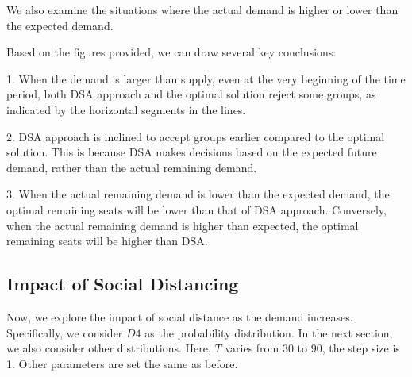 We also examine the situations where the actual demand is higher or lower than the expected demand.


Based on the figures provided, we can draw several key conclusions:

1. When the demand is larger than supply, even at the very beginning of the time period, both DSA approach and the optimal solution reject some groups, as indicated by the horizontal segments in the lines.

2. DSA approach is inclined to accept groups earlier compared to the optimal solution. This is because DSA makes decisions based on the expected future demand, rather than the actual remaining demand.

3. When the actual remaining demand is lower than the expected demand, the optimal remaining seats will be lower than that of DSA approach. Conversely, when the actual remaining demand is higher than expected, the optimal remaining seats will be higher than DSA.


\subsection{Impact of Social Distancing}
Now, we explore the impact of social distance as the demand increases. Specifically, we consider $D4$ as the probability distribution. In the next section, we also consider other distributions. Here, $T$ varies from 30 to 90, the step size is 1. Other parameters are set the same as before.



